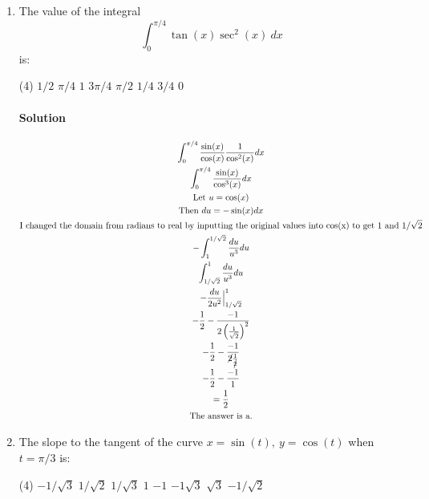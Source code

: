 \documentclass[MATH-115-Notes.tex]{subfiles}
\begin{document}
\begin{enumerate}[itemsep=5mm]
    \item The value of the integral \[\int_{0}^{\pi/4}\tan(x)\sec^2(x)\ dx\] is:
    \begin{tasks}(4)
        \task \(1/2\)
        \task \(\pi/4\)
        \task \(1\)
        \task \(3\pi/4\)
        \task \(\pi/2\)
        \task \(1/4\)
        \task \(3/4\)
        \task \(0\)
    \end{tasks}
    \paragraph*{Solution}
    \begin{gather*}
        \int_{0}^{\pi/4}\frac{\sin(x)}{\cos(x)}\frac{1}{\cos^2(x)}dx\\
        \int_{0}^{\pi/4}\frac{\sin(x)}{\cos^3(x)}dx\\
        \text{Let } u = \cos(x)\\
        \text{Then } du = -\sin(x)dx\\
        \text{I changed the domain from radians to real by inputting the original values into cos(x) to get 1 and $1/\sqrt{2}$}\\
        -\int_{1}^{1/\sqrt{2}}\frac{du}{u^3}du\\
        \int_{1/\sqrt{2}}^{1}\frac{du}{u^3}du\\
        -\frac{du}{2u^2}\Big|_{1/\sqrt{2}}^1\\
        -\frac{1}{2}-\frac{-1}{2\left(\frac{1}{\sqrt{2}}\right)^2}\\
        -\frac{1}{2}-\frac{-1}{\cancel{2}\frac{1}{\cancel{2}}}\\
        -\frac{1}{2}-\frac{-1}{1}\\
        = \frac{1}{2}\\
        \text{The answer is a.}
    \end{gather*}
    
    \item The slope to the tangent of the curve $x = \sin(t),\ y = \cos(t)$ when $t = \pi/3$ is:
    \begin{tasks}(4)
        \task \(-1/\sqrt{3}\)
        \task \(1/\sqrt{2}\)
        \task \(1/\sqrt{3}\)
        \task \(1\)
        \task \(-1\)
        \task \(-1\sqrt{3}\)
        \task \(\sqrt{3}\)
        \task \(-1/\sqrt{2}\)
    \end{tasks}

\end{enumerate}
\end{document}
